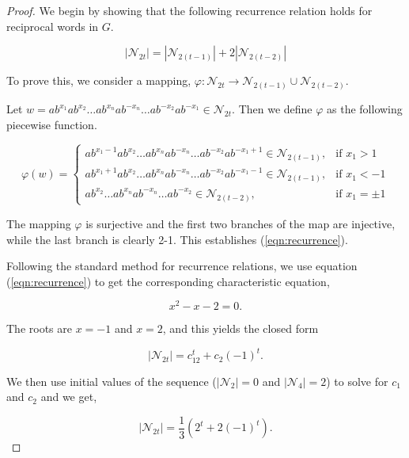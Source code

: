 \documentclass[11pt]{amsart}
\numberwithin{equation}{section}
\theoremstyle{plain}
\begin{document}
\begin{proof}
	We begin by showing that the following recurrence relation holds for reciprocal words in $G$.

\begin{equation}\label{eqn:recurrence}
|\mathcal{N}_{2t}|=|\mathcal{N}_{2(t-1)}|+2|\mathcal{N}_{2(t-2)}|
\end{equation}

To prove this, we consider a mapping, $\varphi: \mathcal{N}_{2t}\to\mathcal{N}_{2(t-1)}\cup\mathcal{N}_{2(t-2)}$.  

Let $w=ab^{x_1}ab^{x_2}\dots ab^{x_n}ab^{-x_n}\dots ab^{-x_2}ab^{-x_1}\in\mathcal{N}_{2t}$.  Then we define $\varphi$ as the following piecewise function.

\begin{equation}\label{eqn:phimap}
\varphi(w)=
\begin{cases}
ab^{x_1-1}ab^{x_2}\dots ab^{x_n}ab^{-x_n}\dots ab^{-x_2}ab^{-x_1+1}\in\mathcal{N}_{2(t-1)}, & \text{if}\,\, x_1>1\\
ab^{x_1+1}ab^{x_2}\dots ab^{x_n}ab^{-x_n}\dots ab^{-x_2}ab^{-x_1-1}\in\mathcal{N}_{2(t-1)}, & \text{if}\,\, x_1<-1\\
ab^{x_2}\dots ab^{x_n}ab^{-x_n}\dots ab^{-x_2}\in\mathcal{N}_{2(t-2)}, & \text{if}\,\, x_1=\pm 1
\end{cases}
\end{equation}

The mapping $\varphi$ is surjective and the first two branches  of the map are injective, while the last branch  is clearly 2-1.  This establishes (\ref{eqn:recurrence}).




	Following the standard method for recurrence relations, we use equation (\ref{eqn:recurrence}) to get the corresponding characteristic equation,  
	
	\begin{equation*}
	x^2 - x - 2 = 0.
	\end{equation*}
	
	The roots are $ x =-1 $ and $ x =2  $, and this yields the closed form
	
	\begin{equation*}
	|\mathcal{N}_{2t}| = c_12^t + c_2(-1)^t.
	\end{equation*}
	
	We then use initial values of the sequence ($|\mathcal{N}_2|=0$ and $|\mathcal{N}_4|=2$) to solve for $c_1$ and $c_2$ and we get,
	
	\begin{equation}\label{eqn:recwordcount}
	|\mathcal{N}_{2t}|=\frac{1}{3}\left(2^t+2(-1)^t\right).
	\end{equation}
	\end{proof}
\end{document}
